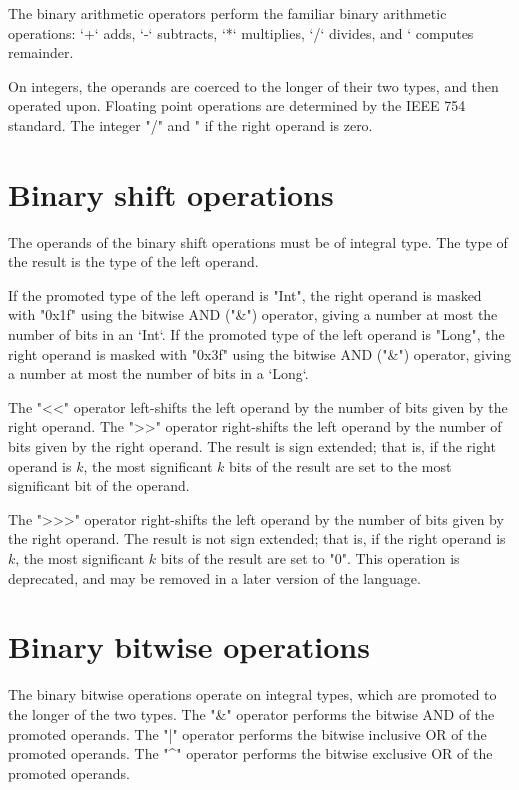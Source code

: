 The binary arithmetic operators perform the familiar binary arithmetic
operations: \xcd`+` adds, \xcd`-` subtracts, \xcd`*` multiplies, 
\xcd`/` divides, and \xcd`%
computes remainder.

On integers, the operands are coerced to the longer of their two types, and
then operated upon.  
Floating point operations are determined by the IEEE 754
standard. 
The integer \xcd"/" and \xcd"%
if the right operand is zero.

\section{Binary shift operations}

The operands of the binary shift operations must be of integral type.
The type of the result is the type of the left operand.

If the promoted type of the left operand is \xcd"Int",
the right operand is masked with \xcd"0x1f" using the bitwise
AND (\xcd"&") operator, giving a number at most the number of bits in an
\xcd`Int`. 
If the promoted type of the left operand is \xcd"Long",
the right operand is masked with \xcd"0x3f" using the bitwise
AND (\xcd"&") operator, giving a number at most the number of bits in a
\xcd`Long`. 

The \xcd"<<" operator left-shifts the left operand by the number of
bits given by the right operand.
The \xcd">>" operator right-shifts the left operand by the number of
bits given by the right operand.  The result is sign extended;
that is, if the right operand is $k$,
the most significant $k$ bits of the result are set to the most
significant bit of the operand.

The \xcd">>>" operator right-shifts the left operand by the number of
bits given by the right operand.  The result is not sign extended;
that is, if the right operand is $k$,
the most significant $k$ bits of the result are set to \xcd"0".
This operation is deprecated, and may be removed in a later version of the
language. 

\section{Binary bitwise operations}

The binary bitwise operations operate on integral types, which are promoted to
the longer of the two types.
The \xcd"&" operator  performs the bitwise AND of the promoted operands.
The \xcd"|" operator  performs the bitwise inclusive OR of the promoted operands.
The \xcd"^" operator  performs the bitwise exclusive OR of the promoted operands.

